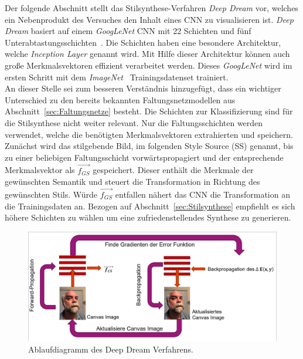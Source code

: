 \documentclass[times, 11pt,twocolumn]{article}
\begin{document}
 \label{sec:DeepDream}
Der folgende Abschnitt stellt das Stilsynthese-Verfahren \textit{Deep Dream} \cite{DeepDream} vor, welches ein Nebenprodukt des Versuches den Inhalt eines CNN zu visualisieren ist. \textit{Deep Dream} basiert auf einem \textit{GoogLeNet} CNN mit 22 Schichten und fünf Unterabtastungsschichten~\cite{Szegedy_2015_CVPR}. Die Schichten haben eine besondere Architektur, welche \textit{Inception Layer} genannt wird. Mit Hilfe dieser Architektur können auch große Merkmalsvektoren effizient verarbeitet werden. Dieses \textit{GoogLeNet} wird im ersten Schritt mit dem \textit{\textit{ImageNet}}~\cite{ImageNet} Trainingsdatenset trainiert.\\
An dieser Stelle sei zum besseren Verständnis hinzugefügt, dass ein wichtiger Unterschied zu den bereits bekannten Faltungsnetzmodellen aus Abschnitt~\ref{sec:Faltungsnetze} besteht. Die Schichten zur Klassifizierung sind für die Stilsynthese nicht weiter relevant. Nur die Faltungsschichten werden verwendet, welche die benötigten Merkmalsvektoren extrahierten und speichern.\\
Zunächst wird das stilgebende Bild, im folgenden Style Source (SS) genannt, bis zu einer beliebigen Faltungsschicht vorwärtspropagiert und der entsprechende Merkmalsvektor als $\vec{f_{GS}}$ gespeichert. Dieser enthält die Merkmale der gewünschten Semantik und steuert die Transformation in Richtung des gewünschten Stils. Würde $\vec{f_{GS}}$ entfallen nähert das CNN die Transformation an die Trainingsdaten an.  Bezogen auf Abschnitt~\ref{sec:Stilsynthese} empfiehlt es sich höhere Schichten zu wählen um eine zufriedenstellendes Synthese zu generieren.\\
\begin{figure}
	\flushleft
	\includegraphics[width=\columnwidth]{Bilder/DeepDream.jpg}
	\caption{Ablaufdiagramm des Deep Dream Verfahrens.}
	\label{fig:DeepDream}
\end{figure}
\end{document}
